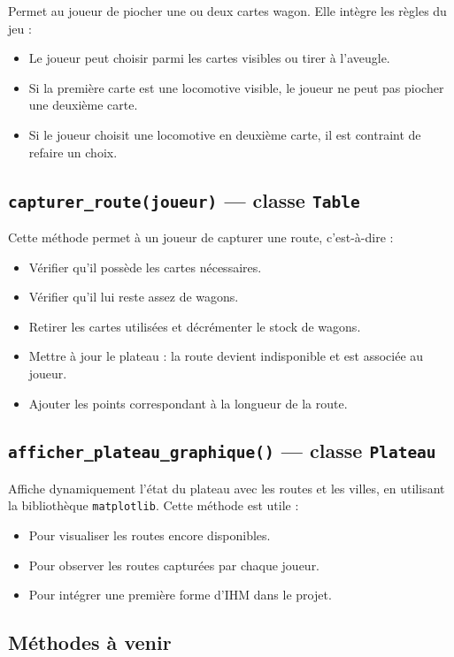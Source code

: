 \documentclass[a4paper,12pt]{report}
\begin{document}
Permet au joueur de piocher une ou deux cartes wagon. Elle intègre les règles du jeu :
\begin{itemize}
    \item Le joueur peut choisir parmi les cartes visibles ou tirer à l’aveugle.
    \item Si la première carte est une locomotive visible, le joueur ne peut pas piocher une deuxième carte.
    \item Si le joueur choisit une locomotive en deuxième carte, il est contraint de refaire un choix.
\end{itemize}

\subsection*{\texttt{capturer\_route(joueur)} — classe \texttt{Table}}

Cette méthode permet à un joueur de capturer une route, c’est-à-dire :
\begin{itemize}
    \item Vérifier qu’il possède les cartes nécessaires.
    \item Vérifier qu’il lui reste assez de wagons.
    \item Retirer les cartes utilisées et décrémenter le stock de wagons.
    \item Mettre à jour le plateau : la route devient indisponible et est associée au joueur.
    \item Ajouter les points correspondant à la longueur de la route.
\end{itemize}

\subsection*{\texttt{afficher\_plateau\_graphique()} — classe \texttt{Plateau}}

Affiche dynamiquement l’état du plateau avec les routes et les villes, en utilisant la bibliothèque \texttt{matplotlib}.
Cette méthode est utile :
\begin{itemize}
    \item Pour visualiser les routes encore disponibles.
    \item Pour observer les routes capturées par chaque joueur.
    \item Pour intégrer une première forme d'IHM dans le projet.
\end{itemize}

\subsection*{Méthodes à venir}
\end{document}
